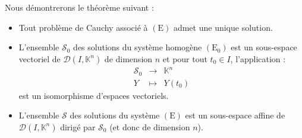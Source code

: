 \documentclass[french]{article}
\newcommand{\K}{\mathbb{K}}
\theoremstyle{plain}
\theoremstyle{definition}
\theoremstyle{remark}
\begin{document}
Nous démontrerons le théorème suivant :

\begin{thm}%
	\begin{itemize}
		\item Tout problème de Cauchy associé à $(\text{E})$ admet une unique solution.
		\item L'ensemble $\mathcal{S}_0$ des solutions du système homogène $(\text{E}_0)$ est un sous-espace vectoriel de $\mathcal{D}(I,\K^n)$ de dimension $n$ et pour tout $t_0\in I$, l'application :
		$$\begin{array}{rcl}
			\mathcal{S}_0&\longrightarrow&\K^n\\
			Y&\longmapsto& Y(t_0)
		\end{array}$$ est un isomorphisme d'espaces vectoriels.
		\item L'ensemble $\mathcal{S}$ des solutions du système $(\text{E})$ est un sous-espace affine de $\mathcal{D}(I,\K^n)$ dirigé par $\mathcal{S}_0$ (et donc de dimension $n$).
	\end{itemize}
\end{thm}
\end{document}
